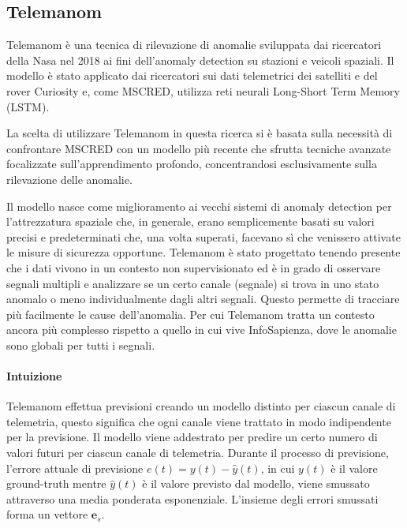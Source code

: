 
\subsection{Telemanom} \label{sez-telemanom}
    Telemanom\cite{telemanom} è una tecnica di rilevazione di anomalie sviluppata dai ricercatori della Nasa nel 2018 
    ai fini dell'anomaly detection su stazioni e veicoli spaziali. Il modello è stato applicato dai ricercatori sui 
    dati telemetrici dei satelliti e del rover Curiosity e, come MSCRED\cite{mscred}, utilizza reti neurali 
    Long-Short Term Memory (LSTM\cite{convlstm}).

    La scelta di utilizzare Telemanom in questa ricerca si è basata sulla necessità di confrontare MSCRED con un modello 
    più recente che sfrutta tecniche avanzate focalizzate sull'apprendimento profondo, concentrandosi esclusivamente 
    sulla rilevazione delle anomalie.

    Il modello nasce come miglioramento ai vecchi sistemi di anomaly detection per l'attrezzatura spaziale 
    che, in generale, erano semplicemente basati su valori precisi e predeterminati che, una volta superati, facevano sì che venissero
    attivate le misure di sicurezza opportune. Telemanom è stato progettato tenendo presente che i dati vivono in un 
    contesto non supervisionato ed è in grado di osservare segnali multipli e analizzare se un certo canale (segnale)
    si trova in uno stato anomalo o meno individualmente dagli altri segnali. Questo permette di tracciare più facilmente 
    le cause dell'anomalia. Per cui Telemanom tratta un contesto ancora più complesso rispetto a quello in cui vive InfoSapienza, 
    dove le anomalie sono globali per tutti i segnali.

    \paragraph{Intuizione} Telemanom effettua previsioni creando un modello distinto per ciascun canale di telemetria,
    questo significa che ogni canale viene trattato in modo indipendente per la previsione. Il modello
    viene addestrato per predire un certo numero di valori futuri per ciascun canale di telemetria. Durante il 
    processo di previsione, l'errore attuale di previsione $e(t) = y(t) - \hat{y}(t)$, in cui $y(t)$ è il valore 
    ground-truth mentre $\hat{y}(t)$ è il valore previsto dal modello, viene smussato attraverso una media 
    ponderata esponenziale. L'insieme degli errori smussati forma un vettore $\mathbf{e}_s$. 
    

